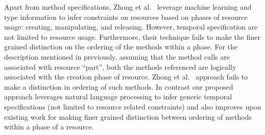 Apart from method specifications, Zhong et al.~\cite{zhong09SE} leverage machine learning and type information to infer constraints on resources based on phases of resource usage: creating, manipulating, and releasing. However, temporal specification are not limited to resource usage. Furthermore, their technique fails to make the finer grained distinction on the ordering of the methods within a phase. For the description mentioned in previously, assuming that the method calls are associated with resource ``part'', both the methods referenced are logically associated with the creation phase of resource. Zhong et al.~\cite{zhong09SE} approach fails to make a distinction in ordering of such methods. In contrast our proposed approach leverages natural language processing to infer generic temporal specifications (not limited to resource related constraints) and also improves upon existing work for making finer grained distinction between ordering of methods within a phase of a resource. 



